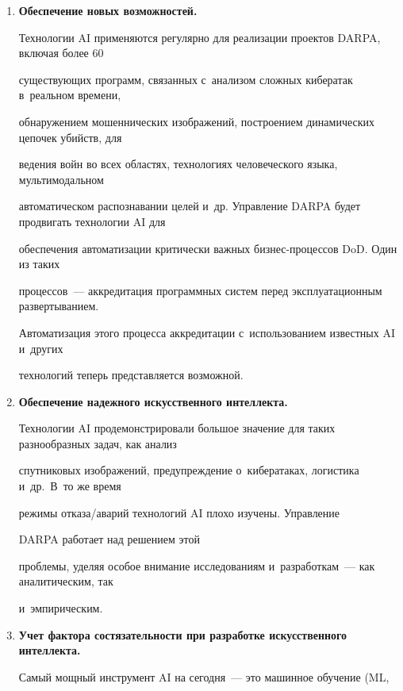   \begin{enumerate}[1.]





\item %


\textbf{Обеспечение новых возможностей.}


Технологии AI применяются регулярно для реализации проектов \mbox{DARPA}, включая более 60


существующих программ, связанных с~анализом сложных кибератак в~реальном времени,


обнаружением мошеннических изображений, построением динамических цепочек убийств, для


ведения войн во всех областях, технологиях человеческого языка, мультимодальном


автоматическом распознавании целей и~др. Управ\-ле\-ние \mbox{DARPA} будет продвигать технологии AI для


обеспечения автоматизации критически важных биз\-нес-про\-цес\-сов DoD. Один из таких


процессов~--- аккредитация программных систем перед эксплуатационным развертыванием.


Автоматизация этого процесса аккредитации с~использованием известных AI и~других


технологий теперь представляется возможной.


\item %


\textbf{Обеспечение надежного искусственного интеллекта.}


Технологии AI продемонстрировали большое значение для таких разнообразных задач, как анализ


спутниковых изображений, предупреждение о~кибератаках, логистика и~др.\ В~то же время


режимы от\-ка\-за\!/\!ава\-рий технологий AI плохо изучены. Управ\-ле\-ние


\mbox{DARPA} работает над решением этой


проблемы, уделяя особое внимание исследованиям и~разработкам~--- как аналитическим, так


и~эмпирическим.


\item %


\textbf{Учет фактора состязательности при разработке искусственного интеллекта.}


Самый мощный инструмент AI на сегодня~--- это машинное обучение (ML,



\end{enumerate}
